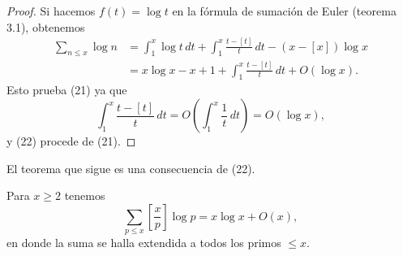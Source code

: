 \documentclass[12pt,a4paper]{book}
\begin{document}
    \begin{proof}
        Si hacemos $f(t)=\log t$ en la fórmula de sumación de Euler (teorema 3.1),
        obtenemos
        \begin{align*}
            \sum_{n\leq x}\log n&=\int_1^x\log t\,dt+\int_1^x\frac{t-[t]}{t}\,dt-(x-[x])\log x\\
            &=x\log x-x+1+\int_1^x\frac{t-[t]}{t}\,dt+O(\log x).
        \end{align*}
        Esto prueba (21) ya que
        \begin{equation*}
            \int_1^x\frac{t-[t]}{t}\,dt=O\left(\int_1^x\frac{1}{t}\,dt\right)=O(\log x),
        \end{equation*}
        y (22) procede de (21).
    \end{proof}

    El teorema que sigue es una consecuencia de (22).

    \begin{teorema}
        Para $x\geq2$ tenemos
        \begin{equation}
            \sum_{p\leq x}\left[\frac{x}{p}\right]\log p=x\log x+O(x),
        \end{equation}
        en donde la suma se halla extendida a todos los primos $\leq x$.
    \end{teorema}
\end{document}
